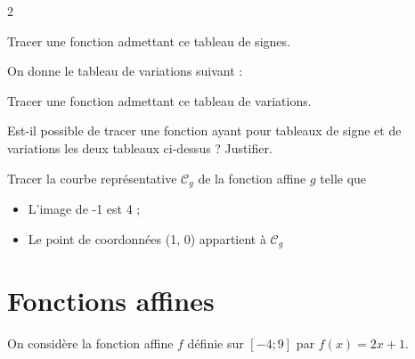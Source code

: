 \documentclass[10pt,a4paper]{article}
\begin{document}
\begin{multicols}{2}
\begin{exo}[][appro]
Tracer une fonction admettant ce tableau de signes.
\end{exo}


\begin{exo}[][appro]
On donne le tableau de variations suivant :

\begin{center}
\end{center}

Tracer une fonction admettant ce tableau de variations.
\end{exo}

\begin{exo}[][avance]
    Est-il possible de tracer une fonction ayant pour tableaux de signe et de variations les deux tableaux ci-dessus ? Justifier.
\end{exo}


\begin{exo}[][appro]
    Tracer la courbe représentative \(\mathcal{C}_g\) de la fonction affine \(g\) telle que \begin{itemize}
        \item L'image de -1 est 4 ;
        \item Le point de coordonnées (1, 0) appartient à \(\mathcal{C}_g\)
    \end{itemize}
\end{exo}


    \section{Fonctions affines}

\begin{exo}[Rappels][]
On considère la fonction affine \(f\) définie sur \(\left[-4;9\right]\) par \(f(x)=2x+1\).


\end{exo}
\end{multicols}
\end{document}
